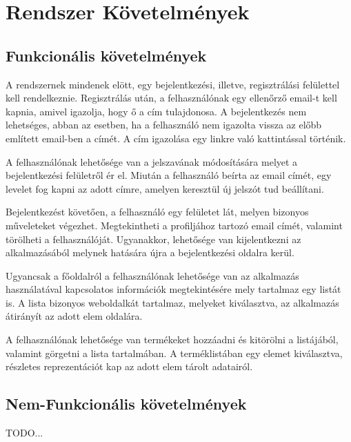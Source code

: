 \section{Rendszer Követelmények}

\subsection{Funkcionális követelmények}

A rendszernek mindenek elött, egy bejelentkezési, illetve, regisztrálási felülettel kell rendelkeznie. Regisztrálás után, a felhasználónak egy ellenőrző email-t kell kapnia, amivel igazolja, hogy ő a cím tulajdonosa. A bejelentkezés nem lehetséges, abban az esetben, ha a felhasználó nem igazolta vissza az előbb említett email-ben a címét. A cím igazolása egy linkre való kattintással történik.

A felhasználónak lehetősége van a jelszavának módosítására melyet a bejelentkezési felületről ér el. Miután a felhasználó beírta az email címét, egy levelet fog kapni az adott címre, amelyen keresztül új jelszót tud beállítani.

Bejelentkezést követően, a felhasználó egy felületet lát, melyen bizonyos műveleteket végezhet. Megtekintheti a profiljához tartozó email címét, valamint törölheti a felhasználóját. Ugyanakkor, lehetősége van kijelentkezni az alkalmazásából melynek hatására újra a bejelentkezési oldalra kerül.

Ugyancsak a főoldalról a felhasználónak lehetősége van az alkalmazás használatával kapcsolatos információk megtekintésére mely tartalmaz egy listát is. A lista bizonyos weboldalkát tartalmaz, melyeket kiválasztva, az alkalmazás átirányít az adott elem oldalára.

A felhasználónak lehetősége van termékeket hozzáadni és kitörölni a listájából, valamint görgetni a lista tartalmában. A terméklistában egy elemet kiválasztva, részletes reprezentációt kap az adott elem tárolt adatairól.

\subsection{Nem-Funkcionális követelmények}

TODO...
